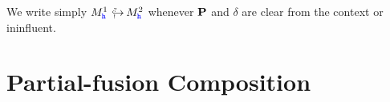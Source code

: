 We write simply $\emb{}{\bm{}}{M^1_\hh}{M^2_\hh}$ whenever
$\roles$ and $\delta$ are clear from the context or ininfluent.




\section{Partial-fusion Composition}



%
%

